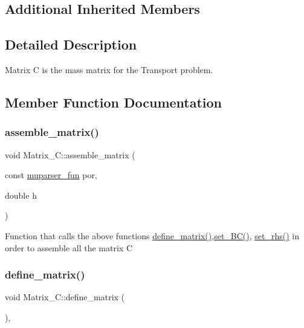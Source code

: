 \subsection*{Additional Inherited Members}


\subsection{Detailed Description}
Matrix C is the mass matrix for the Transport problem. 

\subsection{Member Function Documentation}
\mbox{\label{classMatrix__C_a63752476cb62dc7c22a9b9359f42a995}} 
\subsubsection{\texorpdfstring{assemble\+\_\+matrix()}{assemble\_matrix()}}
{\footnotesize\ttfamily void Matrix\+\_\+\+C\+::assemble\+\_\+matrix (\begin{DoxyParamCaption}\item[{const \hyperlink{classmuparser__fun}{muparser\+\_\+fun}}]{por,  }\item[{double}]{h }\end{DoxyParamCaption})}

Function that calls the above functions \hyperlink{classMatrix__C_a062ab76d181505d1db2e391f02152376}{define\+\_\+matrix()},\hyperlink{classMatrix__C_a9235c2dbf2853fae4122251726a7efce}{set\+\_\+\+B\+C()}, \hyperlink{classMatrix__C_af305bfe533e702d629df3fb0409bc8d2}{set\+\_\+rhs()} in order to assemble all the matrix C \mbox{\label{classMatrix__C_a062ab76d181505d1db2e391f02152376}} 
\subsubsection{\texorpdfstring{define\+\_\+matrix()}{define\_matrix()}}
{\footnotesize\ttfamily void Matrix\+\_\+\+C\+::define\+\_\+matrix (\begin{DoxyParamCaption}{ }\end{DoxyParamCaption})\hspace{0.3cm}{\ttfamily [override]}, {\ttfamily [virtual]}}

